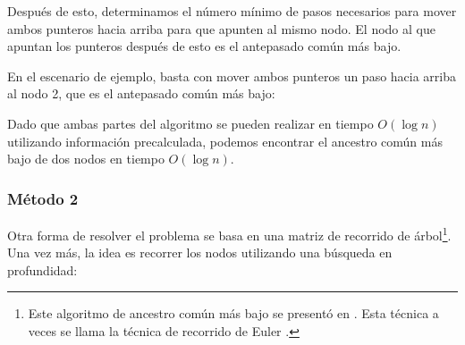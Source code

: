 Después de esto, determinamos el número mínimo de pasos
necesarios para mover ambos punteros hacia arriba para que
apunten al mismo nodo.
El nodo al que apuntan los punteros después de esto
es el antepasado común más bajo.

En el escenario de ejemplo, basta con mover ambos punteros
un paso hacia arriba al nodo 2,
que es el antepasado común más bajo:


\begin{center}
\end{center}

Dado que ambas partes del algoritmo se pueden realizar en
tiempo $O(\log n)$ utilizando información precalculada,
podemos encontrar el ancestro común más bajo de dos
nodos en tiempo $O(\log n)$.

\subsubsection{Método 2}

Otra forma de resolver el problema se basa en
una matriz de recorrido de árbol\footnote{Este algoritmo de ancestro común más bajo se presentó en \cite{ben00}.
Esta técnica a veces se llama la técnica de recorrido de Euler 
 \cite{tar84}.}.
Una vez más, la idea es recorrer los nodos
utilizando una búsqueda en profundidad:

